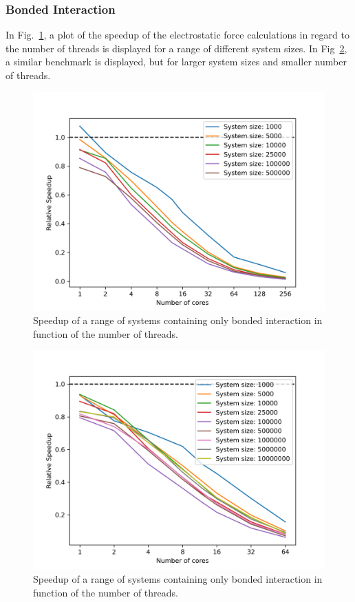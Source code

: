 \documentclass[conference]{IEEEtran}
\begin{document}
        \subsubsection{Bonded Interaction}
        In Fig.~\ref{fig:bonded-speedup}, a plot of the speedup of the electrostatic force calculations 
        in regard to the number of threads is displayed for a range of different system sizes. In 
        Fig~\ref{fig:bonded2-speedup}, a similar benchmark is displayed, but for larger system sizes and smaller
        number of threads.

        \begin{figure}[H]
            \centering
            \includegraphics[width=\linewidth]{./images/bonds_scaling.png} %
            \caption{Speedup of a range of systems containing only bonded interaction in function of the number 
            of threads.}\label{fig:bonded-speedup}
        \end{figure}
        \begin{figure}[H]
            \centering
            \includegraphics[width=\linewidth]{./images/bonds2_scaling.png} %
            \caption{Speedup of a range of systems containing only bonded interaction in function of the number 
            of threads.}\label{fig:bonded2-speedup}
        \end{figure}
    
\end{document}

